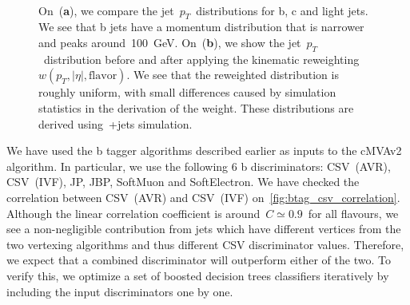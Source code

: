 \begin{figure}
\begin{centering}
 \\
\caption{On~(\textbf{a}), we compare the jet~$p_T$~distributions for b, c and light jets. We see that b jets have a momentum distribution that is narrower and peaks around~100~GeV. On~(\textbf{b}), we show the jet~$p_T$~distribution before and after applying the kinematic reweighting~$w(p_T,|\eta|,\mathrm{flavor})$. We see that the reweighted distribution is roughly uniform, with small differences caused by simulation statistics in the derivation of the weight. These distributions are derived using~\ttbar+jets simulation.}
\label{fig:btag_pt_reweight}
\end{centering}
\end{figure}

We have used the b tagger algorithms described earlier as inputs to the cMVAv2 algorithm. In particular, we use the following 6 b discriminators: CSV~(AVR), CSV~(IVF), JP, JBP, SoftMuon and SoftElectron. We have checked the correlation between CSV~(AVR) and CSV~(IVF) on~\cref{fig:btag_csv_correlation}. Although the linear correlation coefficient is around~$C \simeq 0.9$~for all flavours, we see a non-negligible contribution from jets which have different vertices from the two vertexing algorithms and thus different CSV discriminator values. Therefore, we expect that a combined discriminator will outperform either of the two. To verify this, we optimize a set of boosted decision trees classifiers iteratively by including the input discriminators one by one.

